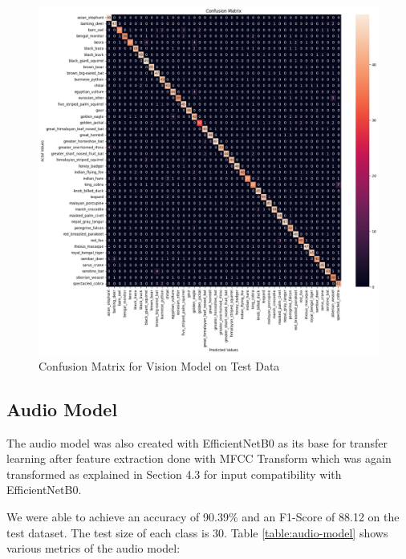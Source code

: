 \documentclass[fleqn, 10pt, twoside]{IOEGC}
\begin{document}
\begin{figure}[t] %
	\centering
	\begin{minipage}{\textwidth} %
		\includegraphics[scale=0.53]{Graphics/vision_cm.png} %
		\caption{Confusion Matrix for Vision Model on Test Data}
		\label{cm_vision}
	\end{minipage}
\end{figure}




\clearpage



\subsection{Audio Model}

The audio model was also created with EfficientNetB0 as its base for transfer learning after feature extraction done with MFCC Transform which was again transformed as explained in Section 4.3 for input compatibility with EfficientNetB0.
\par
We were able to achieve an accuracy of 90.39\% and an F1-Score of 88.12 on the test dataset. The test size of each class is 30. Table \ref{table:audio-model} shows various metrics of the audio model:
\end{document}
